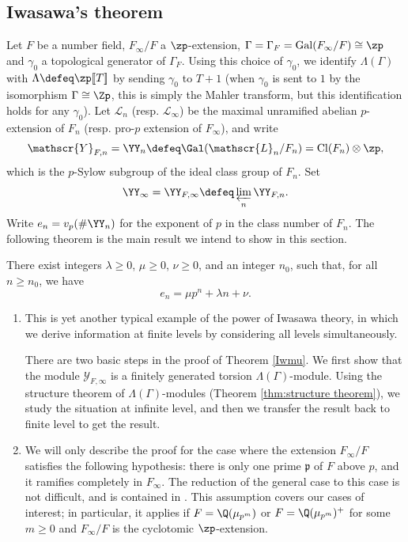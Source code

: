 \documentclass[a4paper,10pt, english, reqno]{smfart}
\newcommand{\lsem}{[\! [}
\newcommand{\rsem}{]\! ]}
\numberwithin{equation}{section}
\begin{document}
\subsection{Iwasawa's theorem}

Let $F$ be a number field, $F_\infty / F$ a $\zp$-extension, $\Gamma = \Gamma_F = \mathrm{Gal}(F_\infty / F) \cong \zp$ and $\gamma_0$ a topological generator of $\Gamma_F$. Using this choice of $\gamma_0$, we identify $\Lambda(\Gamma)$ with $\Lambda \defeq \zp\lsem T\rsem$ by sending $\gamma_0$ to $T + 1$ (when $\gamma_0$ is sent to $1$ by the isomorphism $\Gamma \cong \Zp$, this is simply the Mahler transform, but this identification holds for any $\gamma_0$). Let $\mathscr{L}_n$ (resp. $\mathscr{L}_\infty$) be the maximal unramified abelian $p$-extension of $F_n$ (resp. pro-$p$ extension of $F_\infty$), and write 
\[
\mathscr{Y}_{F, n} = \YY_n \defeq \Gal(\mathscr{L}_n / F_n) = \mathrm{Cl}(F_n) \otimes \zp,
\] 
which is the $p$-Sylow subgroup of the ideal class group of $F_n$. Set 
\[
\YY_\infty = \YY_{F, \infty} \defeq \varprojlim_n \YY_{F, n}. 
\] 
Write $e_n = v_p(\# \YY_n  )$ for the exponent of $p$ in the class number of $F_n$. The following theorem is the main result we intend to show in this section.

\begin{theorem} [Iwasawa] \label{Iwmu}
There exist integers $\lambda \geq 0$, $\mu \geq 0$, $\nu \geq 0$, and an integer $n_0$, such that, for all $n \geq n_0$, we have
\[ e_n = \mu p^{n} + \lambda n + \nu. \]
\end{theorem}

\begin{rem} 
\begin{enumerate}
\item This is yet another typical example of the power of Iwasawa theory, in which we derive information at finite levels by considering all levels simultaneously. 

There are two basic steps in the proof of Theorem \ref{Iwmu}. We first show that the module $\mathscr{Y}_{F, \infty}$ is a finitely generated torsion $\Lambda(\Gamma)$-module. Using the structure theorem of $\Lambda(\Gamma)$-modules (Theorem \ref{thm:structure theorem}), we study the situation at infinite level, and then we transfer the result back to finite level to get the result.
\item We will only describe the proof for the case where the extension $F_\infty / F$ satisfies the following hypothesis: there is only one prime $\mathfrak{p}$ of $F$ above $p$, and it ramifies completely in $F_\infty$. The reduction of the general case to this case is not difficult, and is contained in \cite[\S13]{Washington2}. This assumption covers our cases of interest; in particular, it applies if $F = \Q(\mu_{p^m})$ or $F = \Q(\mu_{p^m})^+$ for some $m \geq 0$ and $F_\infty / F$ is the cyclotomic $\zp$-extension.
\end{enumerate}
\end{rem}
\end{document}

